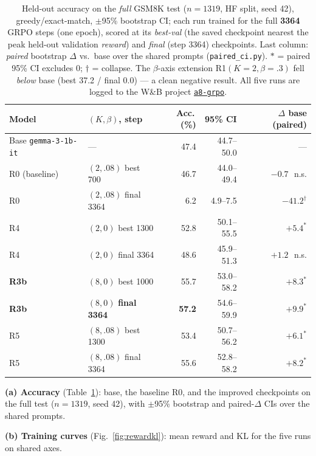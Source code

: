 \documentclass[11pt]{article}
\newcommand{\code}[1]{\texttt{#1}}
\begin{document}
\begin{table}[t]
\centering\small
\caption{Held-out accuracy on the \emph{full} GSM8K test ($n{=}1319$, HF split, seed 42), greedy/exact-match, $\pm$95\% bootstrap CI; each run trained for the full \textbf{3364} GRPO steps (one epoch), scored at its \emph{best-val} (the saved checkpoint nearest the peak held-out validation \emph{reward}) and \emph{final} (step 3364) checkpoints.
Last column: \emph{paired} bootstrap $\Delta$ vs.\ base over the shared prompts (\code{paired\_ci.py}).
$\ast$ = paired 95\% CI excludes 0; $\dagger$ = collapse. The $\beta$-axis extension R1$(K{=}2,\beta{=}.3)$ fell \emph{below} base
(best 37.2 / final 0.0) --- a clean negative result.
All five runs are logged to the W\&B project \href{https://wandb.ai/sichengma0514-university-of-cambridge/a8-grpo}{\texttt{a8-grpo}}.}
\label{tab:acc}
\begin{tabular}{llrrr}
\toprule
Model & $(K,\beta)$, step & Acc.\,(\%) & 95\% CI & $\Delta$ base (paired) \\
\midrule
Base \code{gemma-3-1b-it} & --- & 47.4 & 44.7--50.0 & --- \\
R0 (baseline) & $(2,.08)$ best 700 & 46.7 & 44.0--49.4 & $-0.7$\ \,n.s. \\
R0 & $(2,.08)$ final 3364 & 6.2 & 4.9--7.5 & $-41.2^{\dagger}$ \\
R4 & $(2,0)$ best 1300 & 52.8 & 50.1--55.5 & $+5.4^{\ast}$ \\
R4 & $(2,0)$ final 3364 & 48.6 & 45.9--51.3 & $+1.2$\ \,n.s. \\
\textbf{R3b} & $(8,0)$ best 1000 & 55.7 & 53.0--58.2 & $+8.3^{\ast}$ \\
\textbf{R3b} & $(8,0)$ \textbf{final 3364} & \textbf{57.2} & 54.6--59.9 & $+9.9^{\ast}$ \\
R5 & $(8,.08)$ best 1300 & 53.4 & 50.7--56.2 & $+6.1^{\ast}$ \\
R5 & $(8,.08)$ final 3364 & 55.6 & 52.8--58.2 & $+8.2^{\ast}$ \\
\bottomrule
\end{tabular}
\end{table}

\textbf{(a) Accuracy} (Table~\ref{tab:acc}): base, the baseline R0, and the improved checkpoints on the full test ($n{=}1319$, seed 42), with
$\pm$95\% bootstrap and paired-$\Delta$ CIs over the shared prompts.

\textbf{(b) Training curves} (Fig.~\ref{fig:rewardkl}): mean reward and KL for the five runs on shared axes.
\end{document}
